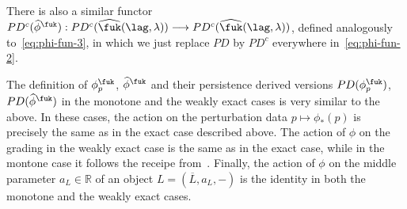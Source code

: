 There is also a similar functor
$PD^c(\widehat{\phi}^{\fuk}) : PD^c(\widehat{\fuk}(\lag, \lambda))
\longrightarrow PD^c(\widehat{\fuk}(\lag, \lambda))$, defined
analogously to~\eqref{eq:phi-fun-3}, in which we just replace $PD$ by
$PD^c$ everywhere in~\eqref{eq:phi-fun-2}.


The definition of $\phi^{\fuk}_{p}$, $\widehat{\phi}^{\fuk}$ and their
persistence derived versions $PD(\phi^{\fuk}_{p})$,
$PD(\widehat{\phi}^{\fuk})$ in the monotone and the weakly exact cases
is very similar to the above. In these cases, the action on the
perturbation data $p \mapsto \phi_*(p)$ is precisely the same as in
the exact case described above. The action of $\phi$ on the grading in
the weakly exact case is the same as in the exact case, while in the
montone case it follows the receipe
from~\cite[Section~2.b]{Se:graded}. Finally, the action of $\phi$ on
the middle parameter $a_L \in \mathbb{R}$ of an object
$L = (\overline{L}, a_L, -)$ is the identity in both the monotone and
the weakly exact cases.


